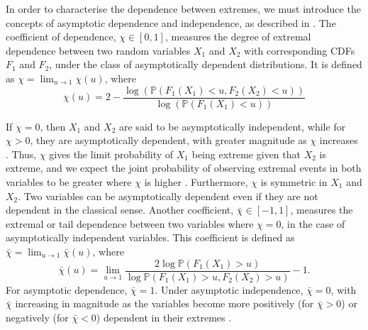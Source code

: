 \documentclass{article}
\numberwithin{equation}{section}
\begin{document}
In order to characterise the dependence between extremes, we must introduce the concepts of asymptotic dependence and independence, as described in \citet{Coles1999}.
The coefficient of dependence, $\chi \in [0, 1]$, measures the degree of extremal dependence between two random variables $X_1$ and $X_2$ with corresponding CDFs $F_1$ and $F_2$, under the class of asymptotically dependent distributions.
It is defined as $\chi = \lim_{u \rightarrow 1}{\chi(u)}$, where
\[
\chi(u) = 2 - \frac{\log\left(\mathbb{P}(F_1(X_1) < u, F_2(X_2) < u)\right)}{\log \left(\mathbb{P}(F_1(X_1) < u)\right)}
\]

If $\chi = 0$, then $X_1$ and $X_2$ are said to be asymptotically independent, while for $\chi > 0$, they are asymptotically dependent, with greater magnitude as $\chi$ increases \citep{Coles1999}.
Thus, $\chi$ gives the limit probability of $X_1$ being extreme given that $X_2$ is extreme, and we expect the joint probability of observing extremal events in both variables to be greater where $\chi$ is higher \citep{Rohrbeck2021}.
Furthermore, $\chi$ is symmetric in $X_1$ and $X_2$.
Two variables can be asymptotically dependent even if they are not dependent in the classical sense.
Another coefficient, $\bar{\chi} \in [-1, 1]$, measures the extremal or tail dependence between two variables where $\chi = 0$, in the case of asymptotically independent variables.
This coefficient is defined as $\bar{\chi} = \lim_{u \rightarrow 1}{\bar{\chi}(u)}$, where
\[
  \bar{\chi}(u) = \lim_{u \rightarrow 1} \frac{2\log\mathbb{P}(F_1(X_1) > u)}{ \log{\mathbb{P}(F_1(X_1) > u, F_2(X_2) > u)}} - 1.
\]
For asymptotic dependence, $\bar{\chi} = 1$.
Under asymptotic independence, $\bar{\chi} = 0$, with $\bar{\chi}$ increasing in magnitude as the variables become more positively (for $\bar{\chi} > 0$) or negatively (for $\bar{\chi} < 0$) dependent in their extremes \citep{Vignotto2021}.
\end{document}

